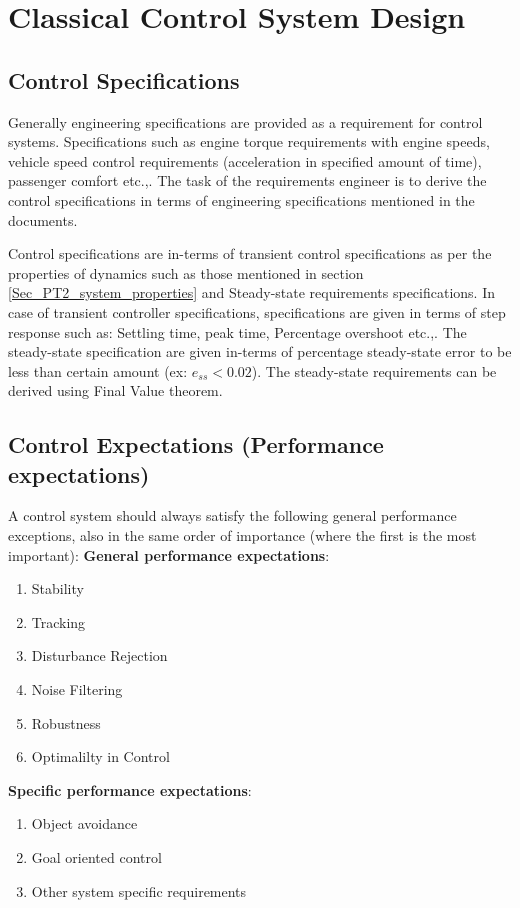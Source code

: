 \chapter{Classical Control System Design}

\section{Control Specifications}

Generally engineering specifications are provided as a requirement for control systems. Specifications such as engine torque requirements with engine speeds, vehicle speed control requirements (acceleration in specified amount of time), passenger comfort etc.,. The task of the requirements engineer is to derive the control specifications in terms of engineering specifications mentioned in the documents. 

Control specifications are in-terms of transient control specifications as per the properties of dynamics such as those mentioned in section \ref{Sec_PT2_system_properties} and Steady-state requirements specifications. In case of transient controller specifications, specifications are given in terms of step response such as: Settling time, peak time, Percentage overshoot etc.,. The steady-state specification are given in-terms of percentage steady-state error to be less than certain amount (ex: $e_{ss} < 0.02$). The steady-state requirements can be derived using Final Value theorem.

\section{Control Expectations (Performance expectations)}

A control system should always satisfy the following general performance exceptions, also in the same order of importance (where the first is the most important):
\textbf{General performance expectations}:
\begin{enumerate}
	\item Stability
	\item Tracking
	\item Disturbance Rejection
	\item Noise Filtering
	\item Robustness
	\item Optimalilty in Control
\end{enumerate}
\textbf{Specific performance expectations}:
\begin{enumerate}
	\item Object avoidance
	\item Goal oriented control
	\item Other system specific requirements
\end{enumerate}

